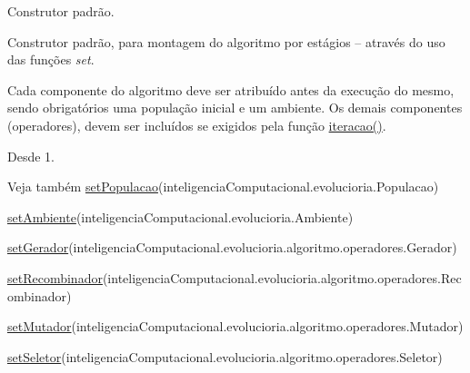 Construtor padrão. 

Construtor padrão, para montagem do algoritmo por estágios – através do uso das funções {\itshape set}.

Cada componente do algoritmo deve ser atribuído antes da execução do mesmo, sendo obrigatórios uma população inicial e um ambiente. Os demais componentes (operadores), devem ser incluídos se exigidos pela função \hyperlink{classic_1_1populacional_1_1algoritmo_1_1_algoritmo_evolucionario_3_01_g_01extends_01_number_00_0bd52af860edf752f8985460efb0aa102_ac7ec720389957da6b0c673e41eb4835d}{iteracao()}. 

\begin{DoxySince}{Desde}
1.
\end{DoxySince}
\begin{DoxySeeAlso}{Veja também}
\hyperlink{classic_1_1populacional_1_1algoritmo_1_1_algoritmo_evolucionario_3_01_g_01extends_01_number_00_0bd52af860edf752f8985460efb0aa102_af0c96a46679b2488c0facb48e50c1b08}{set\-Populacao}(inteligencia\-Computacional.\-evolucioria.\-Populacao) 

\hyperlink{classic_1_1populacional_1_1algoritmo_1_1_algoritmo_evolucionario_3_01_g_01extends_01_number_00_0bd52af860edf752f8985460efb0aa102_a9b7ac1c107c13b4e9d8023cedaec2e06}{set\-Ambiente}(inteligencia\-Computacional.\-evolucioria.\-Ambiente) 

\hyperlink{classic_1_1populacional_1_1algoritmo_1_1_algoritmo_evolucionario_3_01_g_01extends_01_number_00_0bd52af860edf752f8985460efb0aa102_a406d4a36808a9f143b59edef5256b720}{set\-Gerador}(inteligencia\-Computacional.\-evolucioria.\-algoritmo.\-operadores.\-Gerador) 

\hyperlink{classic_1_1populacional_1_1algoritmo_1_1_algoritmo_evolucionario_3_01_g_01extends_01_number_00_0bd52af860edf752f8985460efb0aa102_a3294985c0b68bc7d20a8d77e932e15ee}{set\-Recombinador}(inteligencia\-Computacional.\-evolucioria.\-algoritmo.\-operadores.\-Recombinador) 

\hyperlink{classic_1_1populacional_1_1algoritmo_1_1_algoritmo_evolucionario_3_01_g_01extends_01_number_00_0bd52af860edf752f8985460efb0aa102_a925ccb23537df330b998f518d037c7f9}{set\-Mutador}(inteligencia\-Computacional.\-evolucioria.\-algoritmo.\-operadores.\-Mutador) 

\hyperlink{classic_1_1populacional_1_1algoritmo_1_1_algoritmo_evolucionario_3_01_g_01extends_01_number_00_0bd52af860edf752f8985460efb0aa102_a645a1c47dea80d12448a9be02a2504dd}{set\-Seletor}(inteligencia\-Computacional.\-evolucioria.\-algoritmo.\-operadores.\-Seletor) 
\end{DoxySeeAlso}
